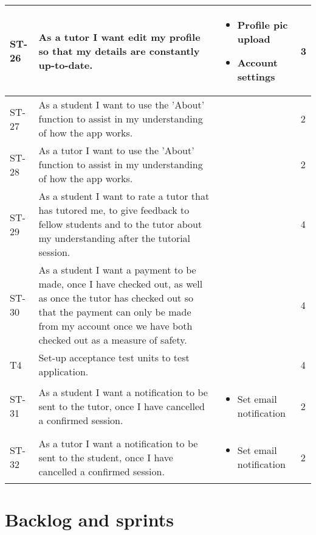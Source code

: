 \documentclass[12pt]{article}
\begin{document}
{\begin{longtable}{| p{1cm} | p{7cm}| p{5cm} | p{1cm} |}
			
			\\ \hline ST-26 & As a tutor I want edit my profile so that my details are constantly up-to-date.  &  \begin{itemize}
			\item Profile pic upload
			\item Account settings
\end{itemize} &3 

			\\ \hline ST-27 & As a student I want to use the 'About' function to assist in my understanding of how the app works.  & &2
			
			\\ \hline ST-28 & As a tutor I want to use the 'About' function to assist in my understanding of how the app works.  & &2 
						
			\\ \hline ST-29 & As a student I want to rate a tutor that has tutored me, to give feedback to fellow students and to the tutor about my understanding after the tutorial session. & &4 
			
			\\ \hline ST-30 & As a student I want a payment to be made, once I have checked out, as well as once the tutor has checked out so that the payment can only be made from my account once we have both checked out as a measure of safety.  & &4 
			
			\\ \hline T4 & Set-up acceptance test units to test application.  & &4 
									\\ \hline ST-31 & As a student I want a notification to be sent to the tutor, once I have cancelled a confirmed session. & \begin{itemize}
			\item Set email notification						
\end{itemize}									 &2 
												\\ \hline ST-32 & As a tutor I want a notification to be sent to the student, once I have cancelled a confirmed session.& \begin{itemize}
			\item Set email notification						
\end{itemize}		 &2 \\ \hline
		

\end{longtable}
}

\newpage
\section{Backlog and sprints}
\end{document}

